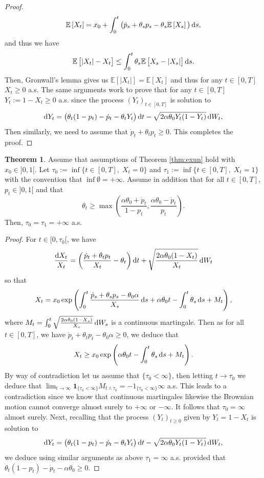 \documentclass[11pt]{article}
\theoremstyle{definition}
\newtheorem{Thm}[Def]{Theorem}
\begin{document}
\begin{proof}
$$
\mathbb E \left[X_t\right]=x_0+  \int_0^t\big(\dot p_s +\theta_sp_s - \theta_s \mathbb E\left[X_s\right]  \big)\dif s,
$$
and thus we have 
$$
\mathbb E\left[|X_t| -X_t \right]\le \int_0^t \theta_s \mathbb E\left[ X_s - |X_s| \right]\dif s.
$$
Then, Gronwall's lemma gives us $\mathbb E\left[|X_t|\right]=\mathbb E \left[X_t\right]$ and thus for any $t\in[0,T]$ $X_t\ge0$ a.s. The same arguments work to prove that  for any $t\in[0,T]$ $Y_t:=1-X_t\ge0$  a.s.  since the process $(Y_t)_{t\in[0,T]}$ is solution to 
$$
\dif Y_t= \big( \theta_t(1-p_t) -\dot p_t - \theta_tY_t  \big)\dif t  -\sqrt{2\alpha \theta_0Y_t(1-Y_t)} \dif W_t,
$$
Then similarly, we need to assume that $\dot p_t +\theta_tp_t\ge 0$. This completes the proof.
\end{proof}

\begin{Thm}\label{thm:mod2}
Assume that assumptions of Theorem \ref{thm:exun} hold with $x_0\in]0,1[$.
Let $\tau_0:=\inf \{t\in[0,T],\; X_t=0\}$ and  $\tau_1:=\inf \{t\in[0,T],\; X_t=1\}$ with the convention that $\inf\emptyset=+\infty$. Assume in addition that for all $t\in[0,T]$,  $p_t\in]0,1[$ and that
\begin{equation}\label{Assumption:3}
\theta_t\geq \max\left(\frac{\alpha\theta_0+\dot p_t}{1-p_t},\frac{\alpha\theta_0-\dot p_t}{p_t}\right)\tag{B}. 
\end{equation}
 Then, $\tau_0=\tau_1=+\infty$ a.s.
\end{Thm}

\begin{proof}
For $t\in[0,\tau_0[$, we have 
$$
\frac{\dif X_t}{X_t}= \left(\frac{\dot p_t +\theta_t p_t}{X_t} - \theta_t\right)\dif t  +\sqrt{\frac{2\alpha \theta_0 (1-X_t)}{X_t}} \dif W_t 
$$  
so that
$$
X_t=x_0\exp\left(\int_0^t \frac{\dot p_s +\theta_sp_s- \theta_0 \alpha}{X_s}\dif s+\alpha\theta_0 t-  \int_0^t\theta_s\dif s + M_t\right),
$$
where $M_t=\int_0^t\sqrt{\frac{2\alpha \theta_0 (1-X_s)}{X_s}} \dif W_s$ is a continuous martingale. Then as for all $t\in[0,T]$, we have $\dot p_t +\theta_tp_t- \theta_0 \alpha\ge0$, we deduce that
$$
X_t\ge x_0\exp\left(\alpha\theta_0 t-  \int_0^t\theta_s\dif s + M_t\right).
$$
By way of contradiction let us assume that  $\{\tau_0<\infty\}$, then letting $t\to \tau_0$ we deduce that $\lim_{t\to \infty} \mathbf 1_{\{\tau_0<\infty\}}M_{t\wedge \tau_0}=\mathbf -1_{\{\tau_0<\infty\}}\infty$ a.s. This leads to a contradiction since we know that continuous martingales likewise the Brownian motion cannot converge almost surely to $+\infty$ or $-\infty$. It follows that $\tau_0=\infty$ almost surely. Next, recalling that  the process $(Y_t)_{t\geq 0}$  given by $Y_t=1-X_t$ is solution to
$$
\dif Y_t= \big( \theta_t(1-p_t) -\dot p_t - \theta_tY_t  \big)\dif t  -\sqrt{2\alpha \theta_0 Y_t(1-Y_t)} \dif W_t,
$$
we deduce using similar arguments as above 
$\tau_1=\infty$ a.s. provided that $\theta_t(1-p_t) -\dot p_t -\alpha \theta_0 \ge 0$.
 \end{proof} 
\end{document}
